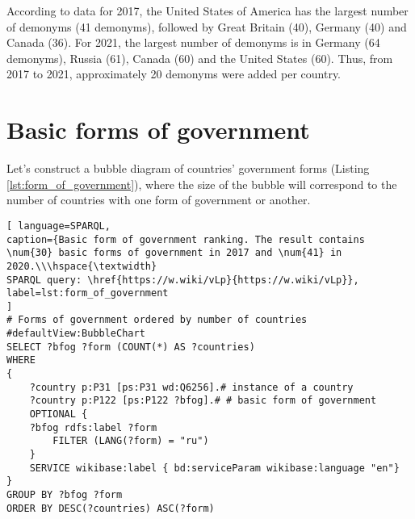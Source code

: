 
According to data for 2017, the United States of America has the largest number of demonyms (41 demonyms), followed by Great Britain (40), Germany (40) and Canada (36). For 2021, the largest number of demonyms is in Germany (64 demonyms), Russia (61), Canada (60) and the United States (60). Thus, from 2017 to 2021, approximately 20 demonyms were added per country.

\section{Basic forms of government}

Let's construct a bubble diagram of countries' government forms (Listing \ref{lst:form_of_government}), where the size of the bubble will correspond to the number of countries with one form of government or another.

\begin{lstlisting}[ language=SPARQL, 
caption={Basic form of government ranking. The result contains \num{30} basic forms of government in 2017 and \num{41} in 2020.\\\hspace{\textwidth}
SPARQL query: \href{https://w.wiki/vLp}{https://w.wiki/vLp}},
label=lst:form_of_government
]
# Forms of government ordered by number of countries
#defaultView:BubbleChart
SELECT ?bfog ?form (COUNT(*) AS ?countries)
WHERE 
{
	?country p:P31 [ps:P31 wd:Q6256].# instance of a country
	?country p:P122 [ps:P122 ?bfog].# # basic form of government
	OPTIONAL {
	?bfog rdfs:label ?form
		FILTER (LANG(?form) = "ru")
	}
	SERVICE wikibase:label { bd:serviceParam wikibase:language "en"}
}
GROUP BY ?bfog ?form
ORDER BY DESC(?countries) ASC(?form)
\end{lstlisting}

